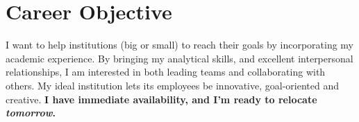 \documentclass[letterpaper]{article}
\begin{document}
{}



\section*{Career Objective}

I want to help institutions (big or small) to reach their goals by incorporating my academic experience. By bringing my analytical skills, and excellent interpersonal relationships, I am interested in both leading teams and collaborating with others. My ideal institution lets its employees be innovative, goal-oriented and creative. {\bf I have immediate availability, and I'm ready to relocate \emph{tomorrow}.}

\bigskip
\end{document}
